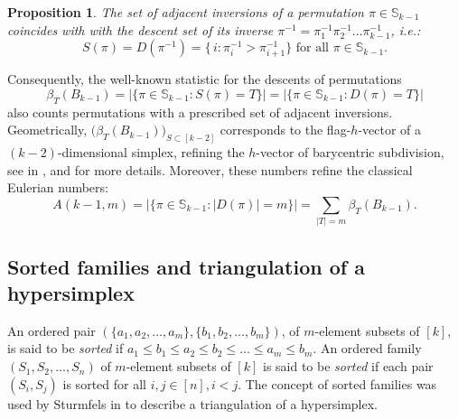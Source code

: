 \documentclass{birkjour}
\newtheorem{prop}[thm]{Proposition}
\theoremstyle{definition}
\theoremstyle{remark}
\numberwithin{equation}{section}
\begin{document}
\begin{prop}\label{P:adjinv=desc}
The set of adjacent inversions of a permutation
$\pi\in\mathbb{S}_{k-1}$ coincides with with the descent set of
its inverse $\pi^{-1}=\pi_1^{-1}\pi_2^{-1}\ldots\pi^{-1}_{k-1}$,
i.e.:
$$ S(\pi)=D(\pi^{-1})=
\big\{\, i:\pi^{-1}_i>\pi^{-1}_{i+1}\big\} \textrm{ for all }
\pi\in\mathbb{S}_{k-1}.$$\end{prop}

Consequently, the well-known statistic for the descents of
permutations
$$\beta_T(B_{k-1})=|\{\pi\in \mathbb{S}_{k-1}:S(\pi)=T\}|=
|\{\pi\in \mathbb{S}_{k-1}:D(\pi)=T\}|$$ also counts permutations
with a prescribed set of adjacent inversions. Geometrically,
$\big(\beta_T(B_{k-1})\big)_{S\subset[k-2]}$ corresponds to the
flag-$h$-vector of a $(k-2)$-dimensional simplex, refining the
$h$-vector of barycentric subdivision, see in
\cite{Bjolex},\cite{Stanleybook} and \cite{Tools} for more
details. Moreover, these numbers refine the classical Eulerian
numbers:
$$A(k-1,m)=|\{\pi\in
\mathbb{S}_{k-1}:|D(\pi)|=m\}|=\sum_{ |T |=m}\beta_T(B_{k-1}).$$

\subsection{Sorted families and triangulation of a hypersimplex}


\noindent An ordered pair
$(\{a_1,a_2,\ldots,a_m\},\{b_1,b_2,\ldots,b_m\})$, of $m$-element
subsets of $[k]$, is said to be \emph{sorted} if $a_1\leq b_1\leq
a_2\leq b_2 \leq\ldots\leq a_m\leq b_m$. An ordered family
$(S_1,S_2,\ldots,S_n)$ of $m$-element subsets of $[k]$ is said to
be \emph{sorted} if each pair $(S_i,S_j)$ is sorted for all
$i,j\in[n],i<j$. The concept of sorted families was used by
Sturmfels in \cite{Sturmfels} to describe a triangulation of a
hypersimplex.
\end{document}
